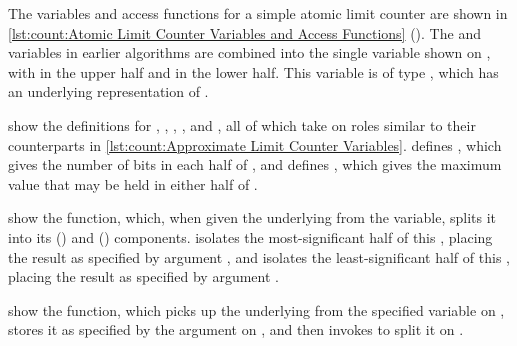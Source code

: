 \begin{fcvref}
The variables and access functions for a simple atomic limit counter
are shown in
\cref{lst:count:Atomic Limit Counter Variables and Access Functions}
().
The  and  variables in earlier algorithms
are combined into the single variable  shown on
, with  in the upper half and  in
the lower half.
This variable is of type , which has an underlying
representation of .

 show the definitions for , ,
, , and , all of which
take on roles similar to their counterparts in
\cref{lst:count:Approximate Limit Counter Variables}.
 defines , which gives the number of bits in each half
of , and  defines , which
gives the maximum value that may be held in either half of
.
\end{fcvref}

\QuickQuizEnd

\begin{fcvref}
 show the 
function, which,
when given the underlying  from the
 variable, splits it into its
 ()
and  () components.
 isolates the most-significant half of this ,
placing the result as specified by argument ,
and  isolates the least-significant half of this ,
placing the result as specified by argument .
\end{fcvref}

\begin{fcvref}
 show the  function, which
picks up the underlying  from the specified variable
on , stores it as specified by the  argument on
, and then invokes  to split
it on .
\end{fcvref}

